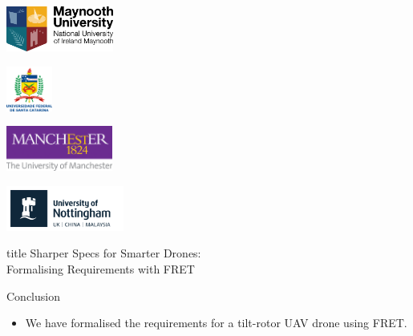 \documentclass[11pt, aspectratio=169, table]{beamer}
\begin{document}
\begin{frame}
\begin{minipage}{0.25\textwidth}
\begin{flushleft}
\includegraphics[height=4em]{images/mu-logo.png}
\end{flushleft}
\end{minipage}\noindent
\begin{minipage}{0.2\textwidth}
\centering
\includegraphics[height=4em]{images/UFSC-logo.png}
\end{minipage}\noindent
\begin{minipage}{0.27\textwidth}
\begin{flushright}
\includegraphics[height=4em]{images/manchester-logo.png}
\end{flushright}
\end{minipage}\noindent
\begin{minipage}{0.3\textwidth}
\begin{flushright}
\includegraphics[height=4em]{images/nottingham-logo.png}
\end{flushright}
\end{minipage}\noindent

  \centering
  \begin{beamercolorbox}[sep=8pt,center,shadow=true,rounded=true]{title}
    Sharper Specs for Smarter Drones: \\Formalising Requirements with FRET\par%
  \end{beamercolorbox}
\begin{block}{Conclusion}
\begin{itemize}
	\item We have formalised the requirements for a tilt-rotor UAV drone using FRET.
	

\end{itemize}
\end{block}
\end{frame}
\end{document}

